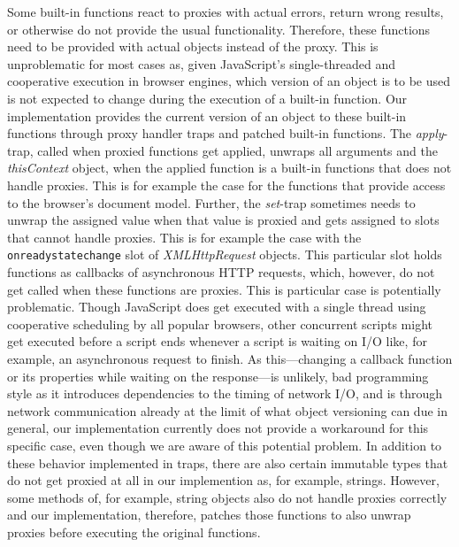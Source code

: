 Some built-in functions react to proxies with actual errors, return wrong results, or otherwise do not provide the usual functionality.
Therefore, these functions need to be provided with actual objects instead of the proxy.
This is unproblematic for most cases as, given JavaScript's single-threaded and cooperative execution in browser engines, which version of an object is to be used is not expected to change during the execution of a built-in function.
Our implementation provides the current version of an object to these built-in functions through proxy handler traps and patched built-in functions.
The \emph{apply}-trap, called when proxied functions get applied, unwraps all arguments and the \emph{thisContext} object, when the applied function is a built-in functions that does not handle proxies.
This is for example the case for the functions that provide access to the browser's document model.
Further, the \emph{set}-trap sometimes needs to unwrap the assigned value when that value is proxied and gets assigned to slots that cannot handle proxies.
This is for example the case with the \lstinline{onreadystatechange} slot of \emph{XMLHttpRequest} objects.
This particular slot holds functions as callbacks of asynchronous HTTP requests, which, however, do not get called when these functions are proxies.
This is particular case is potentially problematic.
Though JavaScript does get executed with a single thread  using cooperative scheduling by all popular browsers, other concurrent scripts might get executed before a script ends whenever a script is waiting on I/O like, for example, an asynchronous request to finish.
As this---changing a callback function or its properties while waiting on the response---is unlikely, bad programming style as it introduces dependencies to the timing of network I/O, and is through network communication already at the limit of what object versioning can due in general, our implementation currently does not provide a workaround for this specific case, even though we are aware of this potential problem. 
In addition to these behavior implemented in traps, there are also certain immutable types that do not get proxied at all in our implemention as, for example, strings.
However, some methods of, for example, string objects also do not handle proxies correctly and our implementation, therefore, patches those functions to also unwrap proxies before executing the original functions.

